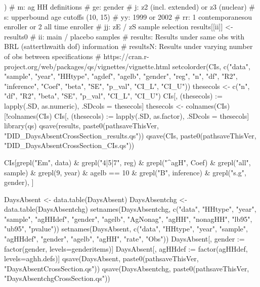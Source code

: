 \begin{Schunk}
\begin{Sinput}
{{{{{{{{                      )
                }  # m: ag HH definitions
              } # ge: gender
            }  # j: z2 (incl. extended) or z3 (nuclear)
          }  # s: upperbound age cutoffs (10, 15)
      } # yy: 1999 or 2002
    } # rr: 1 contemporanesou enroller or 2 all time enroller
  }  # jj: zE / zS sample selection
  results[[ii]] <- results0
}  # ii: main / placebo samples
# results: Results under same obs with BRL (satterthwaith dof) information
# resultsN: Results under varying number of obs between specifications
# https://cran.r-project.org/web/packages/qs/vignettes/vignette.html
setcolorder(CIs,  c("data", "sample", "year", "HHtype", "agdef", "agelb", "gender", "reg", "n", "df", "R2", "inference", 
   "Coef", "beta", "SE", "p_val", "CI_L", "CI_U"))
thesecols <- c("n", "df", "R2", "beta", "SE", "p_val", "CI_L", "CI_U")
CIs[, (thesecols) := lapply(.SD, as.numeric), .SDcols = thesecols]
thesecols <- colnames(CIs)[!colnames(CIs) %in% thesecols]
CIs[, (thesecols) := lapply(.SD, as.factor), .SDcols = thesecols]
library(qs)
qsave(results, paste0(pathsaveThisVer, "DID_DaysAbsentCrossSection_results.qs"))
qsave(CIs, paste0(pathsaveThisVer, "DID_DaysAbsentCrossSection_CIs.qs"))

CIs[grepl("Em", data) & grepl("4|5|7", reg) & grepl("^agH", Coef) & grepl("all", sample) & grepl(9, year) &
  agelb == 10 & grepl("B", inference) & grepl("s.g", gender), ]

DaysAbsent <- data.table(DaysAbsent)
DaysAbsentchg <- data.table(DaysAbsentchg)
setnames(DaysAbsentchg, c("data", "HHtype", "year", "sample", "agHHdef", 
  "gender", "agelb", "AgNonag", "agHH", "nonagHH", "lb95", "ub95", "pvalue"))
setnames(DaysAbsent, c("data", "HHtype", "year", "sample", "agHHdef", "gender", "agelb",
   "agHH",  "rate", "Obs"))
DaysAbsent[, gender := factor(gender, levels=genderitems)]
DaysAbsent[, agHHdef := factor(agHHdef, levels=aghh.defs)]
qsave(DaysAbsent, paste0(pathsaveThisVer, "DaysAbsentCrossSection.qs"))
qsave(DaysAbsentchg, paste0(pathsaveThisVer, "DaysAbsentchgCrossSection.qs"))
\end{Sinput}
\end{Schunk}

